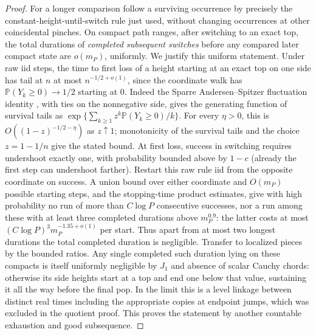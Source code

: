 \begin{proof}
For a longer comparison follow a surviving occurrence by precisely the constant-height-until-switch rule just used, without changing occurrences at other coincidental pinches.
On compact path ranges, after switching to an exact top, the total durations of \emph{completed subsequent switches} before any compared later compact state are \(o(m_P)\), uniformly.
We justify this uniform statement.
Under raw iid steps, the time to first loss of a height starting at an exact top on one side has tail at \(n\) at most \(n^{-1/2+o(1)}\), since the coordinate walk has \(\mathbb P(Y_k\ge0)\to1/2\) starting at 0.
Indeed the Sparre Andersen--Spitzer fluctuation identity \citep[Section~3, Corollary~2, Equation~(3.7)]{SpitzerCombinatorial}, with ties on the nonnegative side, gives the generating function of survival tails as \(\exp\{\sum_{k\ge1}z^k\mathbb P(Y_k\ge0)/k\}\).  For every \(\eta>0\), this is \(O((1-z)^{-1/2-\eta})\) as \(z\uparrow1\); monotonicity of the survival tails and the choice \(z=1-1/n\) give the stated bound.
At first loss, success in switching requires undershoot exactly one, with probability bounded above by \(1-c\) (already the first step can undershoot farther).
Restart this raw rule iid from the opposite coordinate on success. A union bound over either coordinate and \(O(m_P)\) possible starting steps, and the stopping-time product estimates, give with high probability no run of more than \(C\log P\) consecutive successes, nor a run among these with at least three completed durations above \(m_P^{0.9}\): the latter costs at most \((C\log P)^3 m_P^{-1.35+o(1)}\) per start.
Thus apart from at most two longest durations the total completed duration is negligible.
Transfer to localized pieces by the bounded ratios.
Any single completed such duration lying on these compacts is itself uniformly negligible by \(J_1\) and absence of scalar Cauchy chords: otherwise its side heights start at a top and end one below that value, sustaining it all the way before the final pop.
In the limit this is a level linkage between distinct real times including the appropriate copies at endpoint jumps, which was excluded in the quotient proof.
This proves the statement by another countable exhaustion and good subsequence.



\end{proof}
